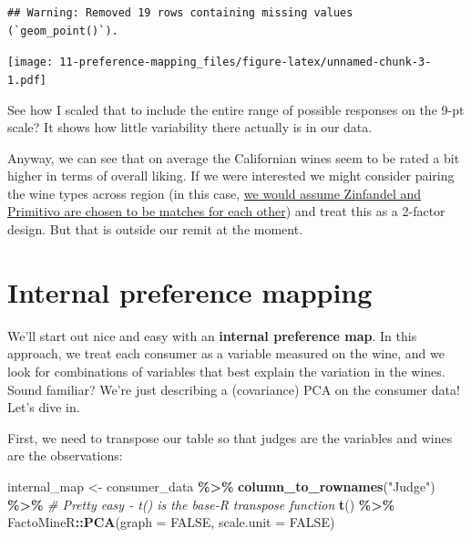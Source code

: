 \documentclass[
]{book}
\newenvironment{Shaded}{\begin{snugshade}}{\end{snugshade}}
\newcommand{\AttributeTok}[1]{\textcolor[rgb]{0.13,0.29,0.53}{#1}}
\newcommand{\CommentTok}[1]{\textcolor[rgb]{0.56,0.35,0.01}{\textit{#1}}}
\newcommand{\ConstantTok}[1]{\textcolor[rgb]{0.56,0.35,0.01}{#1}}
\newcommand{\FunctionTok}[1]{\textcolor[rgb]{0.13,0.29,0.53}{\textbf{#1}}}
\newcommand{\NormalTok}[1]{#1}
\newcommand{\OtherTok}[1]{\textcolor[rgb]{0.56,0.35,0.01}{#1}}
\newcommand{\SpecialCharTok}[1]{\textcolor[rgb]{0.81,0.36,0.00}{\textbf{#1}}}
\newcommand{\StringTok}[1]{\textcolor[rgb]{0.31,0.60,0.02}{#1}}
\begin{document}
\begin{verbatim}
## Warning: Removed 19 rows containing missing values (`geom_point()`).
\end{verbatim}

\texttt{[image: 11-preference-mapping\_files/figure-latex/unnamed-chunk-3-1.pdf]}

See how I scaled that to include the entire range of possible responses on the 9-pt scale? It shows how little variability there actually is in our data.

Anyway, we can see that on average the Californian wines seem to be rated a bit higher in terms of overall liking. If we were interested we might consider pairing the wine types across region (in this case, \href{https://en.wikipedia.org/wiki/Zinfandel}{we would assume Zinfandel and Primitivo are chosen to be matches for each other}) and treat this as a 2-factor design. But that is outside our remit at the moment.

\section{Internal preference mapping}\label{internal-preference-mapping}

We'll start out nice and easy with an \textbf{internal preference map}. In this approach, we treat each consumer as a variable measured on the wine, and we look for combinations of variables that best explain the variation in the wines. Sound familiar? We're just describing a (covariance) PCA on the consumer data! Let's dive in.

First, we need to transpose our table so that judges are the variables and wines are the observations:

\begin{Shaded}
\begin{Highlighting}[]
\NormalTok{internal\_map }\OtherTok{\textless{}{-}} 
\NormalTok{  consumer\_data }\SpecialCharTok{\%\textgreater{}\%}
  \FunctionTok{column\_to\_rownames}\NormalTok{(}\StringTok{"Judge"}\NormalTok{) }\SpecialCharTok{\%\textgreater{}\%}
  \CommentTok{\# Pretty easy {-} \textasciigrave{}t()\textasciigrave{} is the base{-}\textasciigrave{}R\textasciigrave{} transpose function}
  \FunctionTok{t}\NormalTok{() }\SpecialCharTok{\%\textgreater{}\%}
\NormalTok{  FactoMineR}\SpecialCharTok{::}\FunctionTok{PCA}\NormalTok{(}\AttributeTok{graph =} \ConstantTok{FALSE}\NormalTok{, }\AttributeTok{scale.unit =} \ConstantTok{FALSE}\NormalTok{)}
\end{Highlighting}
\end{Shaded}
\end{document}
